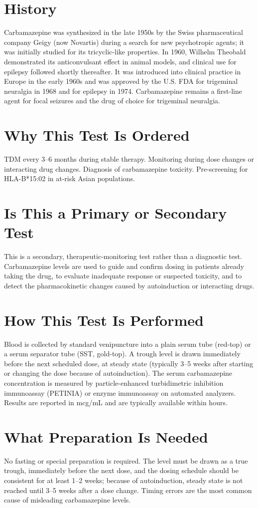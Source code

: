 \section*{History}
Carbamazepine was synthesized in the late 1950s by the Swiss pharmaceutical company Geigy (now Novartis) during a search for new psychotropic agents; it was initially studied for its tricyclic-like properties. In 1960, Wilhelm Theobald demonstrated its anticonvulsant effect in animal models, and clinical use for epilepsy followed shortly thereafter. It was introduced into clinical practice in Europe in the early 1960s and was approved by the U.S. FDA for trigeminal neuralgia in 1968 and for epilepsy in 1974. Carbamazepine remains a first-line agent for focal seizures and the drug of choice for trigeminal neuralgia.
\section*{Why This Test Is Ordered}
TDM every 3--6 months during stable therapy. Monitoring during dose changes or interacting drug changes. Diagnosis of carbamazepine toxicity. Pre-screening for HLA-B*15:02 in at-risk Asian populations.
\section*{Is This a Primary or Secondary Test}
This is a secondary, therapeutic-monitoring test rather than a diagnostic test. Carbamazepine levels are used to guide and confirm dosing in patients already taking the drug, to evaluate inadequate response or suspected toxicity, and to detect the pharmacokinetic changes caused by autoinduction or interacting drugs.
\section*{How This Test Is Performed}
Blood is collected by standard venipuncture into a plain serum tube (red-top) or a serum separator tube (SST, gold-top). A trough level is drawn immediately before the next scheduled dose, at steady state (typically 3--5 weeks after starting or changing the dose because of autoinduction). The serum carbamazepine concentration is measured by particle-enhanced turbidimetric inhibition immunoassay (PETINIA) or enzyme immunoassay on automated analyzers. Results are reported in mcg/mL and are typically available within hours.
\section*{What Preparation Is Needed}
No fasting or special preparation is required. The level must be drawn as a true trough, immediately before the next dose, and the dosing schedule should be consistent for at least 1--2 weeks; because of autoinduction, steady state is not reached until 3--5 weeks after a dose change. Timing errors are the most common cause of misleading carbamazepine levels.
